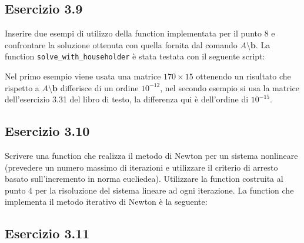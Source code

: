  
 
	\subsection{Esercizio 3.9}
	
Inserire due esempi di utilizzo della function implementata per il punto 8 e confrontare la soluzione ottenuta con quella fornita dal comando $A\setminus \mathbf{b}$.
\PP
La function \lstinline{solve_with_householder} è stata testata con il seguente script:

Nel primo esempio viene usata una matrice $170 \times 15$ ottenendo un risultato che rispetto a $A\setminus \mathbf{b}$ differisce di un ordine $10^{-12}$, nel secondo esempio si usa la matrice dell'esercizio 3.31 del libro di testo, la differenza qui è dell'ordine di $10^{-15}$.


 
	\subsection{Esercizio 3.10}
	
Scrivere una function che realizza il metodo di Newton per un sistema nonlineare (prevedere un numero massimo di iterazioni e utilizzare il criterio di arresto basato sull’incremento in norma eucliedea). Utilizzare la function costruita al punto 4 per la risoluzione del sistema lineare ad ogni iterazione.
\PP
	La function che implementa il metodo iterativo di Newton è la seguente:



 
	\subsection{Esercizio 3.11}
	
